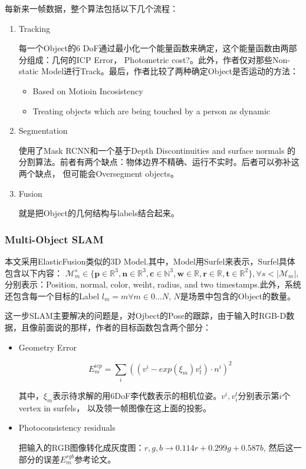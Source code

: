 每新来一帧数据，整个算法包括以下几个流程：
\begin{enumerate}
\item Tracking

每一个Object的6 DoF通过最小化一个能量函数来确定，这个能量函数由两部分组成：几何的ICP Error， Photometric cost?。此外，作者仅对那些Non-static Model进行Track。最后，作者比较了两种确定Object是否运动的方法：
\begin{itemize}
\item Based on Motioin Incosistency
\item Treating objects which are being touched by a person as dynamic
\end{itemize}

\item Segmentation

使用了Mask RCNN和一个基于Depth Discontinuities and surface normals 的分割算法。前者有两个缺点：物体边界不精确、运行不实时。后者可以弥补这两个缺点， 但可能会Oversegment objects。

\item Fusion

就是把Object的几何结构与labels结合起来。

\end{enumerate}

\subsubsection{Multi-Object SLAM}

本文采用ElasticFusion类似的3D Model.其中，Model用Surfel来表示，Surfel具体包含以下内容：
$\mathcal{M}_m^s \in \{ \mathbf{p}\in\mathbb{R}^3, \mathbf{n}\in\mathbb{R}^3,\mathbf{c}\in\mathbb{N}^3,\mathbf{w}\in\mathbb{R},\mathbf{r}\in\mathbb{R}, \mathbf{t}\in\mathbb{R}^2  \}, \forall s < |\mathcal{M}_m|$, 分别表示：Position, normal, color, weiht, radius, and two timestamps.此外，系统还包含每一个目标的Label $l_m =m \forall m \in 0 \ldots N$, $N$是场景中包含的Object的数量。

这一步SLAM主要解决的问题是，对Ojbect的Pose的跟踪，由于输入时RGB-D数据，且像前面说的那样，作者的目标函数包含两个部分：
\begin{itemize}
\item Geometry Error

\begin{displaymath}
E_m^{icp} = \sum_{i}\left( (v^i - exp(\xi_m)v_t^i)\cdot n^i  \right)^2
\end{displaymath}

其中，$\xi_m$表示待求解的用6DoF李代数表示的相机位姿。$v^i, v_i^t$分别表示第$i$个vertex in surfels， 以及领一帧图像在这上面的投影。

\item Photoconsistency residuals

把输入的RGB图像转化成灰度图：$r, g, b \rightarrow 0.114r + 0.299g + 0.587b$, 然后这一部分的误差$E_m^{rgb}$参考论文。

\end{itemize}

